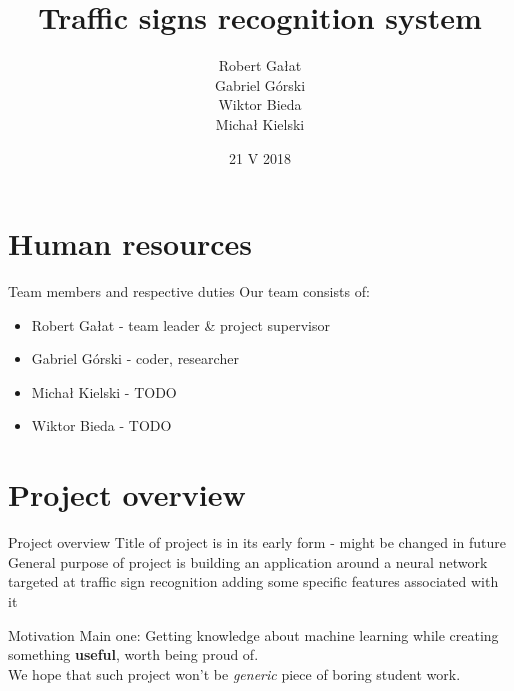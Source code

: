  \usepackage{adjustbox}

\title{Traffic signs recognition system} \author{Robert Gałat\\Gabriel
  Górski\\Wiktor Bieda\\Michał Kielski} \date{21 V 2018} 


\maketitle
\part{Human resources}
\begin{frame}{Team members and respective duties}
  Our team consists of:
  \begin{itemize}
  \item Robert Gałat - team leader \& project supervisor
  \item Gabriel Górski - coder, researcher
  \item Michał Kielski - TODO
  \item Wiktor Bieda - TODO
  \end{itemize}
\end{frame}
\part{Project overview}
\begin{frame}{Project overview}
  Title of project is in its early form - might be changed in future\\

  General purpose of project is building an application around a neural network
  targeted at traffic sign recognition adding some specific features associated
  with it
\end{frame}
\begin{frame}{Motivation}
  Main one: Getting knowledge about machine learning while creating something
  \textbf{useful}, worth being proud of.\\

  We hope that such project won't be \textit{generic} piece of boring student
  work.
\end{frame}
